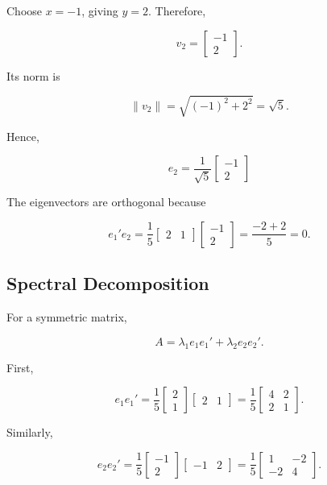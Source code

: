 \documentclass[12pt]{article}
\begin{document}
Choose $x=-1$, giving $y=2$. Therefore,

\[
v_2=
\begin{bmatrix}
-1\\
2
\end{bmatrix}.
\]

Its norm is

\[
\|v_2\|
=
\sqrt{(-1)^2+2^2}
=
\sqrt{5}.
\]

Hence,

\[
\boxed{
e_2=
\frac{1}{\sqrt{5}}
\begin{bmatrix}
-1\\
2
\end{bmatrix}}
\]

The eigenvectors are orthogonal because

\[
e_1'e_2
=
\frac{1}{5}
\begin{bmatrix}
2&1
\end{bmatrix}
\begin{bmatrix}
-1\\
2
\end{bmatrix}
=
\frac{-2+2}{5}
=0.
\]

\subsection*{Spectral Decomposition}

For a symmetric matrix,

\[
A=\lambda_1e_1e_1'+\lambda_2e_2e_2'.
\]

First,

\[
e_1e_1'
=
\frac{1}{5}
\begin{bmatrix}
2\\
1
\end{bmatrix}
\begin{bmatrix}
2&1
\end{bmatrix}
=
\frac{1}{5}
\begin{bmatrix}
4&2\\
2&1
\end{bmatrix}.
\]

Similarly,

\[
e_2e_2'
=
\frac{1}{5}
\begin{bmatrix}
-1\\
2
\end{bmatrix}
\begin{bmatrix}
-1&2
\end{bmatrix}
=
\frac{1}{5}
\begin{bmatrix}
1&-2\\
-2&4
\end{bmatrix}.
\]
\end{document}
